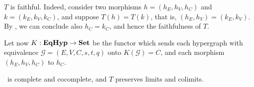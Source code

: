 \begin{remark}
	$T$ is faithful. Indeed, consider two morphisms $h = (h_E, h_V, h_C)$ and $k = (k_E, k_V, k_C)$, and suppose $T(h) = T(k)$, that is, $(h_E, h_V) = (k_E, k_V)$.
	By , we can conclude also $h_C = k_C$, and hence the faithfulness of $T$.
\end{remark}

Let now $K: \textbf{\textup{EqHyp}} \to \mathbf{Set}$ be the functor which sends each hypergraph with equivalence $\mathcal{G} = (E, V, C, s, t, q)$ onto $K(\mathcal{G}) = C$, and each morphism $(h_E, h_V, h_C)$ to $h_C$.

\begin{proposition}\label{prop:eqhyp_complete}
	\EqHyp \, is complete and cocomplete, and $T$ preserves limits and colimits.
\end{proposition}

